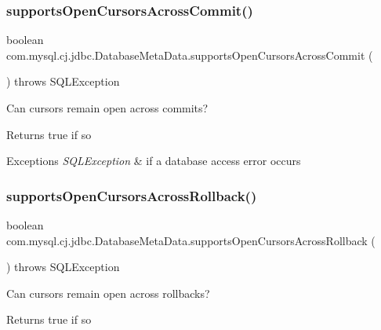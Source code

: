 \subsubsection{\texorpdfstring{supports\+Open\+Cursors\+Across\+Commit()}{supportsOpenCursorsAcrossCommit()}}
{\footnotesize\ttfamily boolean com.\+mysql.\+cj.\+jdbc.\+Database\+Meta\+Data.\+supports\+Open\+Cursors\+Across\+Commit (\begin{DoxyParamCaption}{ }\end{DoxyParamCaption}) throws S\+Q\+L\+Exception}

Can cursors remain open across commits?

\begin{DoxyReturn}{Returns}
true if so 
\end{DoxyReturn}

\begin{DoxyExceptions}{Exceptions}
{\em S\+Q\+L\+Exception} & if a database access error occurs \\
\hline
\end{DoxyExceptions}
\mbox{\label{classcom_1_1mysql_1_1cj_1_1jdbc_1_1_database_meta_data_af3a996ba4e3b048d32c31eb7c3b78d72}} 
\subsubsection{\texorpdfstring{supports\+Open\+Cursors\+Across\+Rollback()}{supportsOpenCursorsAcrossRollback()}}
{\footnotesize\ttfamily boolean com.\+mysql.\+cj.\+jdbc.\+Database\+Meta\+Data.\+supports\+Open\+Cursors\+Across\+Rollback (\begin{DoxyParamCaption}{ }\end{DoxyParamCaption}) throws S\+Q\+L\+Exception}

Can cursors remain open across rollbacks?

\begin{DoxyReturn}{Returns}
true if so 
\end{DoxyReturn}

